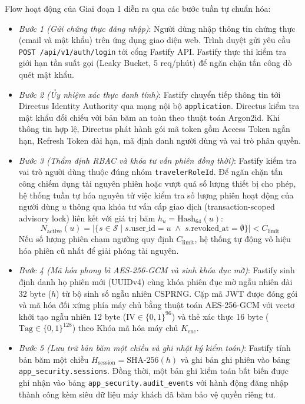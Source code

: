 Flow hoạt động của Giai đoạn 1 diễn ra qua các bước tuần tự chuẩn hóa:
\begin{itemize}
    \item[-] \textit{Bước 1 (Gửi chứng thực đăng nhập)}: Người dùng nhập thông tin chứng thực (email và mật khẩu) trên ứng dụng giao diện web. Trình duyệt gửi yêu cầu \texttt{POST /api/v1/auth/login} tới cổng Fastify API. Fastify thực thi kiểm tra giới hạn tần suất gọi (Leaky Bucket, 5 req/phút) để ngăn chặn tấn công dò quét mật khẩu.
    \item[-] \textit{Bước 2 (Ủy nhiệm xác thực danh tính)}: Fastify chuyển tiếp thông tin tới Directus Identity Authority qua mạng nội bộ \texttt{application}. Directus kiểm tra mật khẩu đối chiếu với bản băm an toàn theo thuật toán Argon2id. Khi thông tin hợp lệ, Directus phát hành gói mã token gồm Access Token ngắn hạn, Refresh Token dài hạn, mã định danh người dùng và vai trò phân quyền.
    \item[-] \textit{Bước 3 (Thẩm định RBAC và khóa tư vấn phiên đồng thời)}: Fastify kiểm tra vai trò người dùng thuộc đúng nhóm \texttt{travelerRoleId}. Để ngăn chặn tấn công chiếm dụng tài nguyên phiên hoặc vượt quá số lượng thiết bị cho phép, hệ thống tuần tự hóa nguyên tử việc kiểm tra số lượng phiên hoạt động của người dùng $u$ thông qua khóa tư vấn cấp giao dịch (transaction-scoped advisory lock) liên kết với giá trị băm $h_u = \text{Hash}_{64}(u)$:
    \begin{equation}
    \label{eq:concurrency_bound_vi}
    N_{\text{active}}(u) = \Big| \big\{ s \in \mathcal{S} \;\big|\; s.\text{user\_id} = u \;\wedge\; s.\text{revoked\_at} = \emptyset \big\} \Big| < C_{\text{limit}}
    \end{equation}
    Nếu số lượng phiên chạm ngưỡng quy định $C_{\text{limit}}$, hệ thống tự động vô hiệu hóa phiên cũ nhất để giải phóng tài nguyên.
    \item[-] \textit{Bước 4 (Mã hóa phong bì AES-256-GCM và sinh khóa đục mờ)}: Fastify sinh định danh họ phiên mới (UUIDv4) cùng khóa phiên đục mờ ngẫu nhiên dài 32 byte ($h$) từ bộ sinh số ngẫu nhiên CSPRNG. Cặp mã JWT được đóng gói và mã hóa đối xứng phía máy chủ bằng thuật toán AES-256-GCM với vectơ khởi tạo ngẫu nhiên 12 byte ($\text{IV} \in \{0, 1\}^{96}$) và thẻ xác thực 16 byte ($\text{Tag} \in \{0, 1\}^{128}$) theo Khóa mã hóa máy chủ $K_{\text{enc}}$.
    \item[-] \textit{Bước 5 (Lưu trữ bản băm một chiều và ghi nhật ký kiểm toán)}: Fastify tính bản băm một chiều $H_{\text{session}} = \text{SHA-256}(h)$ và ghi bản ghi phiên vào bảng \texttt{app\_security.sessions}. Đồng thời, một bản ghi kiểm toán bất biến được ghi nhận vào bảng \texttt{app\_}\allowbreak\texttt{security.}\allowbreak\texttt{audit\_}\allowbreak\texttt{events} với hành động đăng nhập thành công kèm siêu dữ liệu máy khách đã băm bảo vệ quyền riêng tư.

\end{itemize}
